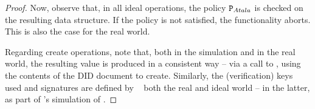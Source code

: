 \begin{proof}
  Now, observe that, in all ideal operations, the policy $\P_{Atala}$ is checked
  on the resulting data structure. If the policy is not satisfied, the
  functionality aborts. This is also the case for the real world.

  Regarding create operations, note that, both in the simulation and in the real
  world, the resulting \did value is produced in a consistent way -- via a call
  to \IdealGRO, using the contents of the DID document to create.
  Similarly, the (verification) keys used and signatures are defined by \adv~
  both the real and ideal world -- in the latter, as part of \Sim's simulation
  of \IdealFSig.
  
\end{proof}


